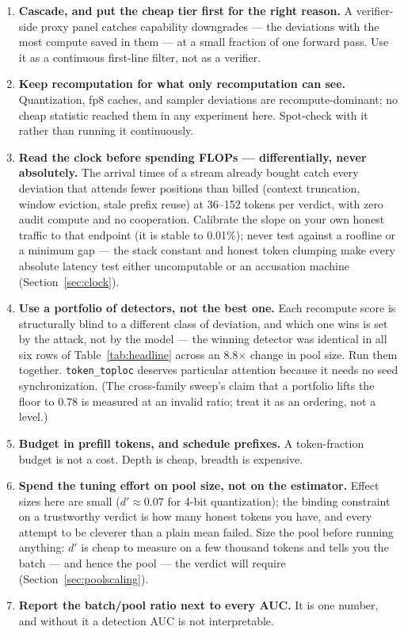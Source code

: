 \documentclass[11pt]{article}
\newcommand{\tl}{\texttt{token\_toploc}}
\begin{document}
\begin{enumerate}
\item \textbf{Cascade, and put the cheap tier first for the right reason.} A
verifier-side proxy panel catches capability downgrades --- the deviations with the
most compute saved in them --- at a small fraction of one forward pass. Use it as a
continuous first-line filter, not as a verifier.
\item \textbf{Keep recomputation for what only recomputation can see.} Quantization,
fp8 caches, and sampler deviations are recompute-dominant; no cheap statistic reached
them in any experiment here. Spot-check with it rather than running it continuously.
\item \textbf{Read the clock before spending FLOPs --- differentially, never
absolutely.} The arrival times of a stream already bought catch every deviation
that attends fewer positions than billed (context truncation, window eviction,
stale prefix reuse) at 36--152 tokens per verdict, with zero audit compute and no
cooperation. Calibrate the slope on your own honest traffic to that endpoint (it
is stable to 0.01\%); never test against a roofline or a minimum gap --- the
stack constant and honest token clumping make every absolute latency test either
uncomputable or an accusation machine (Section~\ref{sec:clock}).
\item \textbf{Use a portfolio of detectors, not the best one.} Each recompute score
is structurally blind to a different class of deviation, and which one wins is set
by the attack, not by the model --- the winning detector was identical in all six
rows of Table~\ref{tab:headline} across an 8.8$\times$ change in pool size. Run
them together. \tl{} deserves particular attention because it needs no seed
synchronization. (The cross-family sweep's claim that a portfolio lifts the floor
to 0.78 is measured at an invalid ratio; treat it as an ordering, not a level.)
\item \textbf{Budget in prefill tokens, and schedule prefixes.} A token-fraction
budget is not a cost. Depth is cheap, breadth is expensive.
\item \textbf{Spend the tuning effort on pool size, not on the estimator.} Effect
sizes here are small ($d' \approx 0.07$ for 4-bit quantization); the binding
constraint on a trustworthy verdict is how many honest tokens you have, and every
attempt to be cleverer than a plain mean failed. Size the pool before running
anything: $d'$ is cheap to measure on a few thousand tokens and tells you the batch
--- and hence the pool --- the verdict will require
(Section~\ref{sec:poolscaling}).
\item \textbf{Report the batch/pool ratio next to every AUC.} It is one number, and
without it a detection AUC is not interpretable.
\end{enumerate}
\end{document}
